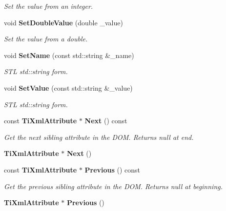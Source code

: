 \begin{CompactItemize}
\begin{CompactList}\small\item\em Set the value from an integer. \item\end{CompactList}\item 
void {\bf Set\-Double\-Value} (double \_\-value)\label{classTiXmlAttribute_TiXmlAttributea12}

\begin{CompactList}\small\item\em Set the value from a double. \item\end{CompactList}\item 
void {\bf Set\-Name} (const std::string \&\_\-name)\label{classTiXmlAttribute_TiXmlAttributea13}

\begin{CompactList}\small\item\em STL std::string form. \item\end{CompactList}\item 
void {\bf Set\-Value} (const std::string \&\_\-value)\label{classTiXmlAttribute_TiXmlAttributea14}

\begin{CompactList}\small\item\em STL std::string form. \item\end{CompactList}\item 
const {\bf Ti\-Xml\-Attribute} $\ast$ {\bf Next} () const\label{classTiXmlAttribute_TiXmlAttributea15}

\begin{CompactList}\small\item\em Get the next sibling attribute in the DOM. Returns null at end. \item\end{CompactList}\item 
{\bf Ti\-Xml\-Attribute} $\ast$ {\bf Next} ()\label{classTiXmlAttribute_TiXmlAttributea16}

\item 
const {\bf Ti\-Xml\-Attribute} $\ast$ {\bf Previous} () const\label{classTiXmlAttribute_TiXmlAttributea17}

\begin{CompactList}\small\item\em Get the previous sibling attribute in the DOM. Returns null at beginning. \item\end{CompactList}\item 
{\bf Ti\-Xml\-Attribute} $\ast$ {\bf Previous} ()\label{classTiXmlAttribute_TiXmlAttributea18}


\end{CompactItemize}
